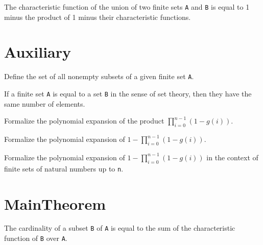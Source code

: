 \begin{lemma}\label{char_fun_union}
  The characteristic function of the union of two finite sets \verb|A| and \verb|B| is equal to 1 minus the product of 1 minus their characteristic functions.
\end{lemma}
\section{Auxiliary}

\begin{definition}\label{Finset.powerset₀}
  \leanok
  Define the set of all nonempty subsets of a given finite set \verb|A|.
\end{definition}

\begin{lemma}\label{card_eq}
  If a finite set \verb|A| is equal to a set \verb|B| in the sense of set theory, then they have the same number of elements.
\end{lemma}

\begin{lemma}\label{mul_expand₃}
  Formalize the polynomial expansion of the product \(\prod_{i=0}^{n-1} (1 - g(i))\).
\end{lemma}

\begin{lemma}\label{mul_expand₂}
  Formalize the polynomial expansion of \(1 - \prod_{i=0}^{n-1} (1 - g(i))\).
\end{lemma}

\begin{lemma}\label{mul_expand₁}
  Formalize the polynomial expansion of \(1 - \prod_{i=0}^{n-1} (1 - g(i))\) in the context of finite sets of natural numbers up to \verb|n|.
\end{lemma}


\section{MainTheorem}

\begin{lemma}\label{card_eq_sum_char_fun}
  \leanok
  The cardinality of a subset \verb|B| of \verb|A| is equal to the sum of the characteristic function of \verb|B| over \verb|A|.
\end{lemma}

